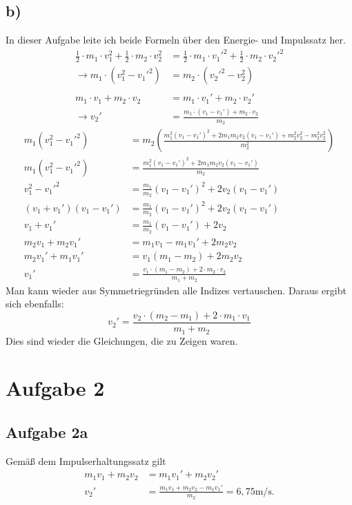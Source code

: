 \documentclass[a4paper,10pt]{extarticle}
\begin{document}
\subsection*{b)}
In dieser Aufgabe leite ich beide Formeln über den Energie- und Impulssatz her.
\begin{align*}
\frac{1}{2}\cdot m_1\cdot v_1^2+\frac{1}{2}\cdot m_2\cdot v_2^2&=\frac{1}{2}\cdot m_1\cdot v_1'^2+\frac{1}{2}\cdot m_2\cdot v_2'^2\\
\rightarrow m_1\cdot(v_1^2-v_1'^2)&=m_2\cdot(v_2'^2-v_2^2)\\ \\
m_1\cdot v_1+m_2\cdot v_2&=m_1\cdot v_1'+m_2\cdot v_2'\\
\rightarrow v_2'&=\frac{m_1\cdot(v_1-v_1')+m_2\cdot v_2}{m_2}
\end{align*}
\begin{align*}
m_1(v_1^2-v_1'^2)&=m_2\left(\frac{m_1^2(v_1-v_1')^2+2m_1m_2v_2(v_1-v_1')+m_2^2v_2^2-m_2^2v_2^2}{m_2^2}\right)\\
m_1(v_1^2-v_1'^2)&=\frac{m_1^2(v_1-v_1')^2+2m_1m_2v_2(v_1-v_1')}{m_2}\\
v_1^2-v_1'^2&=\frac{m_1}{m_2}(v_1-v_1')^2+2v_2(v_1-v_1')\\
(v_1+v_1')(v_1-v_1')&=\frac{m_1}{m_2}(v_1-v_1')^2+2v_2(v_1-v_1')\\
v_1+v_1'&=\frac{m_1}{m_2}(v_1-v_1')+2v_2\\
m_2v_1+m_2v_1'&=m_1v_1-m_1v_1'+2m_2v_2\\
m_2v_1'+m_1v_1'&=v_1(m_1-m_2)+2m_2v_2\\
v_1'&=\frac{v_1\cdot(m_1-m_2)+2\cdot m_2\cdot v_2}{m_1+m_2}
\end{align*}
Man kann wieder aus Symmetriegründen alle Indizes vertauschen. Daraus ergibt sich ebenfalls:
\begin{equation*}
v_2'=\frac{v_2\cdot(m_2-m_1)+2\cdot m_1\cdot v_1}{m_1+m_2}
\end{equation*}
Dies sind wieder die Gleichungen, die zu Zeigen waren.

\section*{Aufgabe 2}
\subsection*{Aufgabe 2a}
Gemäß dem Impulserhaltungssatz gilt
\begin{align*}
  m_1v_1 + m_2v_2 &= m_1v_1'+m_2v_2'\\
  v_2'&=\frac{m_1v_1 + m_2v_2 - m_1v_1'}{m_2} = 6,75 \mbox{m/s.}
\end{align*}
\end{document}
